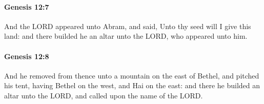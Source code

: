 		\paragraph{Genesis 12:7} %
			\label{GENESIS-12-7}

			And the LORD appeared unto Abram, and said, Unto thy seed will I give this land: and there builded he an altar unto the LORD, who appeared unto him.


		\paragraph{Genesis 12:8} %
			\label{GENESIS-12-8}

			And he removed from thence unto a mountain on the east of Bethel, and pitched his tent, having Bethel on the west, and Hai on the east: and there he builded an altar unto the LORD, and called upon the name of the LORD.


